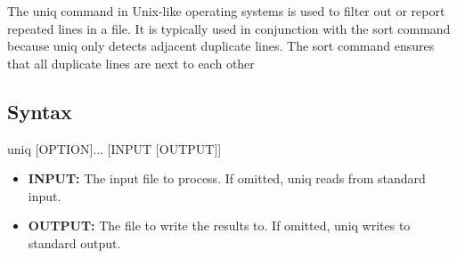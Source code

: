 \documentclass{report}
\begin{document}
    \pagebreak 
    \bigbreak \noindent 
    The uniq command in Unix-like operating systems is used to filter out or report repeated lines in a file. It is typically used in conjunction with the sort command because uniq only detects adjacent duplicate lines. The sort command ensures that all duplicate lines are next to each other
    \bigbreak \noindent 
    \subsection{Syntax}
    \bigbreak \noindent 
    \begin{bashcode}
    uniq [OPTION]... [INPUT [OUTPUT]]
    \end{bashcode}
    \begin{itemize}
        \item \textbf{INPUT:} The input file to process. If omitted, uniq reads from standard input.
        \item \textbf{OUTPUT:} The file to write the results to. If omitted, uniq writes to standard output.
    \end{itemize}
    \bigbreak \noindent 
\end{document}
